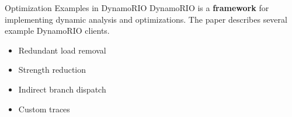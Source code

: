 \documentclass[aspectratio=169,xcolor=x11names]{beamer}
\begin{document}
	\begin{frame}{Optimization Examples in DynamoRIO}
		DynamoRIO is a \textbf{framework} for implementing dynamic analysis and optimizations. The paper describes several example DynamoRIO clients.
		\begin{itemize}
			\item Redundant load removal %
			\item Strength reduction %
			\item Indirect branch dispatch %
			\item Custom traces %
		\end{itemize}
	\end{frame}
\end{document}
